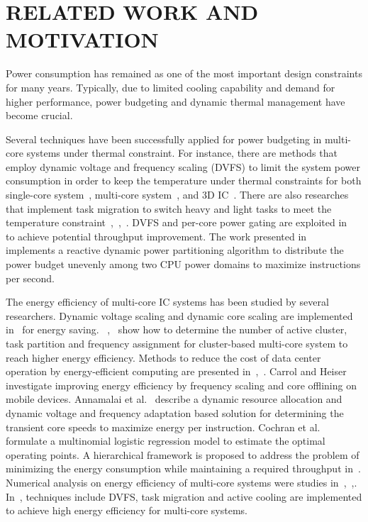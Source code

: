 \section{RELATED WORK AND MOTIVATION}
\label{sec:related_works}
Power consumption has remained as one of the most important design constraints for many years. Typically, due to limited cooling capability and demand for higher performance, power budgeting and dynamic thermal management have become crucial.

Several techniques have been successfully applied for power budgeting in multi-core systems under thermal constraint. For instance, there are methods that employ dynamic voltage and frequency scaling (DVFS) to limit the system power consumption in order to keep the temperature under thermal constraints for both single-core system~\cite{Skadron:MICRO'03}, multi-core system~\cite{Jayaseelan:ICCAD'09}, and 3D IC~\cite{Coskun:DATE'09}. There are also researches that implement task migration to switch heavy and light tasks to meet the temperature constraint~\cite{Ge:DAC'10},~\cite{Chantem:TVLSI'11},~\cite{Liu:DATE'12}. DVFS and per-core power gating are exploited in~\cite{Lee:TVLSI'12} to achieve potential throughput improvement. The work presented in~\cite{Kultursay:CHSCSS'12} implements a reactive dynamic power partitioning 
algorithm to distribute the power budget unevenly among two CPU power domains to maximize instructions per second. %

The energy efficiency of multi-core IC systems has been studied by several researchers. Dynamic voltage scaling and dynamic core scaling are implemented in~\cite{Seo:TPDS'08} for energy saving. ~\cite{Majzoub:TCAD'10},~\cite{Kong:DATE'11} show how to determine the number of active cluster, task partition and frequency assignment for cluster-based multi-core system to reach higher energy efficiency. Methods to reduce the cost of data center operation by energy-efficient computing are presented in~\cite{Pedram:TCAD'12},~\cite{Wang:access'17}. Carrol and Heiser~\cite{Carroll:RTAS'14} investigate improving energy efficiency by frequency scaling and core offlining on mobile devices. Annamalai et al.~\cite{Annamalai:ISVLSI'14} describe a dynamic resource allocation and dynamic voltage and frequency adaptation based solution for determining the transient core speeds to maximize energy per instruction. Cochran et al.~\cite{Cochran:ICCAD'11} formulate a multinomial logistic regression model to estimate the optimal operating points. A hierarchical framework is proposed to address the problem of minimizing the energy consumption while maintaining a required throughput in~\cite{Ghasemazar:ISCAS'10}. Numerical analysis on energy efficiency of multi-core systems were studies in~\cite{Woo:Computer'08},~\cite{Hill:Computer'08},\cite{Sun:JPDC'10}. In~\cite{Hanumaiah:TCOMP'14}, techniques include DVFS, task migration and active cooling are implemented to achieve high energy efficiency for multi-core systems.

